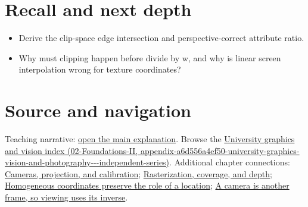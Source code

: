 \section{Recall and next depth}\label{appendix-40426e4b2103-recall-and-next-depth}

\begin{itemize}
\tightlist
\item
  Derive the clip-space edge intersection and perspective-correct attribute ratio.
\item
  Why must clipping happen before divide by w, and why is linear screen interpolation wrong for texture coordinates?
\end{itemize}

\section{Source and navigation}\label{appendix-40426e4b2103-source-and-navigation}

Teaching narrative: \href{Continuous\%20Notes/University\%20-\%20Worlds,\%20Images\%20and\%20Inference\%20-\%20Graphics,\%20Vision\%20and\%20Photography\#Rasterization,\%20coverage,\%20and\%20depth}{open the main explanation}. Browse the \href{../02-Foundations-II/main.pdf\#nameddest=appendix-a6d556a4ef50-university-graphics-vision-and-photography---independent-series}{University graphics and vision index (02-Foundations-II, appendix-a6d556a4ef50-university-graphics-vision-and-photography-\/-\/-independent-series)}. Additional chapter connections: \href{Continuous\%20Notes/University\%20-\%20Worlds,\%20Images\%20and\%20Inference\%20-\%20Graphics,\%20Vision\%20and\%20Photography\#Cameras,\%20projection,\%20and\%20calibration}{Cameras, projection, and calibration}; \href{Continuous\%20Notes/University\%20-\%20Worlds,\%20Images\%20and\%20Inference\%20-\%20Graphics,\%20Vision\%20and\%20Photography\#Rasterization,\%20coverage,\%20and\%20depth}{Rasterization, coverage, and depth}; \href{Continuous\%20Notes/Computing\%20Foundations\%20-\%20From\%20Bits\%20to\%20C++\%20and\%20Systems\%20APIs\#Homogeneous\%20coordinates\%20preserve\%20the\%20role\%20of\%20a\%20location}{Homogeneous coordinates preserve the role of a location}; \href{Continuous\%20Notes/Computing\%20Foundations\%20-\%20From\%20Bits\%20to\%20C++\%20and\%20Systems\%20APIs\#A\%20camera\%20is\%20another\%20frame,\%20so\%20viewing\%20uses\%20its\%20inverse}{A camera is another frame, so viewing uses its inverse}.

